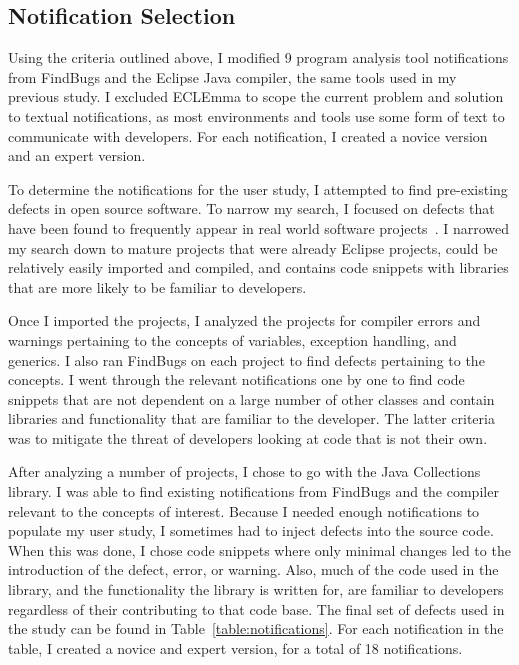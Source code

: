 \subsection{Notification Selection}

Using the criteria outlined above, I modified 9 program analysis tool notifications from FindBugs and the Eclipse Java compiler, the same tools used in my previous study. I excluded ECLEmma to scope the current problem and solution to textual notifications, as most environments and tools use some form of text to communicate with developers. For each notification, I created a novice version and an expert version.

To determine the notifications for the user study, I attempted to find pre-existing defects in open source software. To narrow my search, I focused on defects that have been found to frequently appear in real world software projects~\cite{ayewah2010google}. 
I narrowed my search down to mature projects that were already Eclipse projects, could be relatively easily imported and compiled, and contains code snippets with libraries that are more likely to be familiar to developers.

Once I imported the projects, I analyzed the projects for compiler errors and warnings pertaining to the concepts of variables, exception handling, and generics.
I also ran FindBugs on each project to find defects pertaining to the concepts.
I went through the relevant notifications one by one to find code snippets that are not dependent on a large number of other classes and contain libraries and functionality that are familiar to the developer. The latter criteria was to mitigate the threat of developers looking at code that is not their own.

After analyzing a number of projects, I chose to go with the Java Collections library. I was able to find existing notifications from FindBugs and the compiler relevant to the concepts of interest. Because I needed enough notifications to populate my user study, I sometimes had to inject defects into the source code. When this was done, I chose code snippets where only minimal changes led to the introduction of the defect, error, or warning. Also, much of the code used in the library, and the functionality the library is written for, are familiar to developers regardless of their contributing to that code base.
The final set of defects used in the study can be found in Table~\ref{table:notifications}. For each notification in the table, I created a novice and expert version, for a total of 18 notifications.

